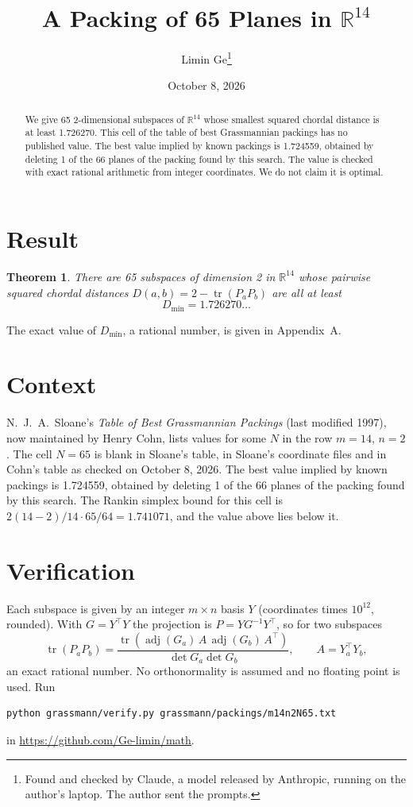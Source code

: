 \documentclass[11pt,a4paper]{article}
\title{A Packing of 65 Planes in $\mathbb{R}^{14}$}
\author{Limin Ge\thanks{Found and checked by Claude, a model released by Anthropic, running on the author's laptop. The author sent the prompts.}}
\date{October 8, 2026}
\newtheorem*{theorem}{Theorem}
\begin{document}
\maketitle
\begin{abstract}
We give 65 2-dimensional subspaces of $\mathbb{R}^{14}$ whose smallest squared chordal distance is at least 1.726270. This cell of the table of best Grassmannian packings has no published value. The best value implied by known packings is 1.724559, obtained by deleting 1 of the 66 planes of the packing found by this search. The value is checked with exact rational arithmetic from integer coordinates. We do not claim it is optimal.
\end{abstract}

\section{Result}
\begin{theorem}
There are 65 subspaces of dimension 2 in $\mathbb{R}^{14}$ whose pairwise squared chordal distances $D(a,b) = 2 - \operatorname{tr}(P_aP_b)$ are all at least
\[ D_{\min} = 1.726270\ldots \]
\end{theorem}
The exact value of $D_{\min}$, a rational number, is given in Appendix~A.


\section{Context}
N.~J.~A.~Sloane's \emph{Table of Best Grassmannian Packings} (last modified 1997), now maintained by Henry Cohn, lists values for some $N$ in the row $m=14$, $n=2$. The cell $N=65$ is blank in Sloane's table, in Sloane's coordinate files and in Cohn's table as checked on October 8, 2026. The best value implied by known packings is 1.724559, obtained by deleting 1 of the 66 planes of the packing found by this search. The Rankin simplex bound for this cell is $2(14-2)/14\cdot 65/64 = 1.741071$, and the value above lies below it.


\section{Verification}
Each subspace is given by an integer $m\times n$ basis $Y$ (coordinates times $10^{12}$, rounded). With $G=Y^\top Y$ the projection is $P=YG^{-1}Y^\top$, so for two subspaces
\[ \operatorname{tr}(P_aP_b)=\frac{\operatorname{tr}(\operatorname{adj}(G_a)\,A\,\operatorname{adj}(G_b)\,A^\top)}{\det G_a\det G_b},\qquad A=Y_a^\top Y_b, \]
an exact rational number. No orthonormality is assumed and no floating point is used. Run
\begin{verbatim}
python grassmann/verify.py grassmann/packings/m14n2N65.txt
\end{verbatim}
in \url{https://github.com/Ge-limin/math}.
\end{document}
